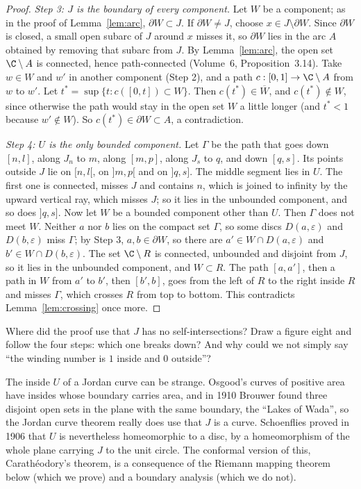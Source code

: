\begin{proof}
\emph{Step 3: $J$ is the boundary of every component.} Let $W$ be a component; as in the proof of Lemma~\ref{lem:arc}, $\partial W\subset J$. If $\partial W\ne J$, choose $x\in J\setminus\partial W$.
Since $\partial W$ is closed, a small open subarc of $J$ around $x$ misses it, so $\partial W$ lies in the arc $A$ obtained by removing that subarc from $J$. By Lemma~\ref{lem:arc}, the open set
$\C\setminus A$ is connected, hence path-connected (Volume~6, Proposition~3.14). Take $w\in W$ and $w'$ in another component (Step 2), and a path $c:[0,1]\to\C\setminus A$ from $w$ to $w'$. Let
$t^*=\sup\{t:c([0,t])\subset W\}$. Then $c(t^*)\in\overline W$, and $c(t^*)\notin W$, since otherwise the path would stay in the open set $W$ a little longer (and $t^*<1$ because $w'\notin W$). So
$c(t^*)\in\partial W\subset A$, a contradiction.

\emph{Step 4: $U$ is the only bounded component.} Let $\Gamma$ be the path that goes down $[n,l]$, along $J_n$ to $m$, along $[m,p]$, along $J_s$ to $q$, and down $[q,s]$. Its points outside $J$
lie on $[n,l[$, on $]m,p[$ and on $]q,s]$. The middle segment lies in $U$. The first one is connected, misses $J$ and contains $n$, which is joined to infinity by the upward vertical ray, which misses
$J$; so it lies in the unbounded component, and so does $]q,s]$. Now let $W$ be a bounded component other than $U$. Then $\Gamma$ does not meet $W$. Neither $a$ nor $b$ lies on the compact
set $\Gamma$, so some discs $D(a,\varepsilon)$ and $D(b,\varepsilon)$ miss $\Gamma$; by Step 3, $a,b\in\partial W$, so there are $a'\in W\cap D(a,\varepsilon)$ and $b'\in W\cap D(b,\varepsilon)$. The set $\C\setminus R$ is
connected, unbounded and disjoint from $J$, so it lies in the unbounded component, and $W\subset R$. The path $[a,a']$, then a path in $W$ from $a'$ to $b'$, then $[b',b]$, goes from the left of
$R$ to the right inside $R$ and misses $\Gamma$, which crosses $R$ from top to bottom. This contradicts Lemma~\ref{lem:crossing} once more.
\end{proof}

\begin{think}
Where did the proof use that $J$ has no self-intersections? Draw a figure eight and follow the four steps: which one breaks down? And why could we not simply say ``the winding number is $1$
inside and $0$ outside''?
\end{think}

\begin{remark}
The inside $U$ of a Jordan curve can be strange. Osgood's curves of positive area have insides whose boundary carries area, and in 1910 Brouwer found three disjoint open sets in the plane
with the same boundary, the ``Lakes of Wada'', so the Jordan curve theorem really does use that $J$ is a curve. Schoenflies proved in 1906 that $U$ is nevertheless homeomorphic to a disc,
by a homeomorphism of the whole plane carrying $J$ to the unit circle. The conformal version of this, Carath\'eodory's theorem, is a consequence of the Riemann mapping theorem below
(which we prove) and a boundary analysis (which we do not).
\end{remark}

